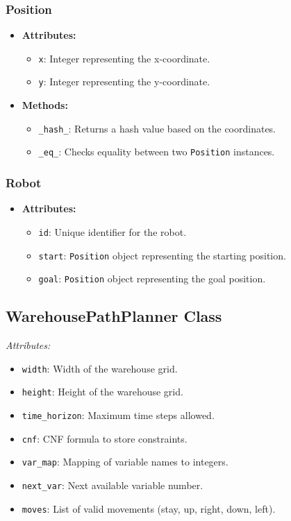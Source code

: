 \documentclass[8pt]{article}
\begin{document}
\subsubsection*{Position}
\begin{itemize}
    \item \textbf{Attributes:} 
    \begin{itemize}
        \item \texttt{x}: Integer representing the x-coordinate.
        \item \texttt{y}: Integer representing the y-coordinate.
    \end{itemize}
    \item \textbf{Methods:}
    \begin{itemize}
        \item \texttt{\_hash\_}: Returns a hash value based on the coordinates.
        \item \texttt{\_eq\_}: Checks equality between two \texttt{Position} instances.
    \end{itemize}
\end{itemize}

\subsubsection*{Robot}
\begin{itemize}
    \item \textbf{Attributes:}
    \begin{itemize}
        \item \texttt{id}: Unique identifier for the robot.
        \item \texttt{start}: \texttt{Position} object representing the starting position.
        \item \texttt{goal}: \texttt{Position} object representing the goal position.
    \end{itemize}
\end{itemize}

\subsection{WarehousePathPlanner Class}
\emph{Attributes:}
\begin{itemize}
    \item \texttt{width}: Width of the warehouse grid.
    \item \texttt{height}: Height of the warehouse grid.
    \item \texttt{time\_horizon}: Maximum time steps allowed.
    \item \texttt{cnf}: CNF formula to store constraints.
    \item \texttt{var\_map}: Mapping of variable names to integers.
    \item \texttt{next\_var}: Next available variable number.
    \item \texttt{moves}: List of valid movements (stay, up, right, down, left).
\end{itemize}
\end{document}
